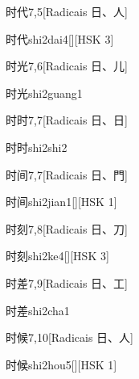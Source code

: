 \begin{entry}{时代}{7,5}[Radicais ⽇、⼈]
  \begin{phonetics}{时代}{shi2dai4}[][HSK 3]
  \end{phonetics}
\end{entry}

\begin{entry}{时光}{7,6}[Radicais ⽇、⼉]
  \begin{phonetics}{时光}{shi2guang1}
  \end{phonetics}
\end{entry}

\begin{entry}{时时}{7,7}[Radicais ⽇、⽇]
  \begin{phonetics}{时时}{shi2shi2}
  \end{phonetics}
\end{entry}

\begin{entry}{时间}{7,7}[Radicais ⽇、⾨]
  \begin{phonetics}{时间}{shi2jian1}[][HSK 1]
  \end{phonetics}
\end{entry}

\begin{entry}{时刻}{7,8}[Radicais ⽇、⼑]
  \begin{phonetics}{时刻}{shi2ke4}[][HSK 3]
  \end{phonetics}
\end{entry}

\begin{entry}{时差}{7,9}[Radicais ⽇、⼯]
  \begin{phonetics}{时差}{shi2cha1}
  \end{phonetics}
\end{entry}

\begin{entry}{时候}{7,10}[Radicais ⽇、⼈]
  \begin{phonetics}{时候}{shi2hou5}[][HSK 1]
  \end{phonetics}
\end{entry}

